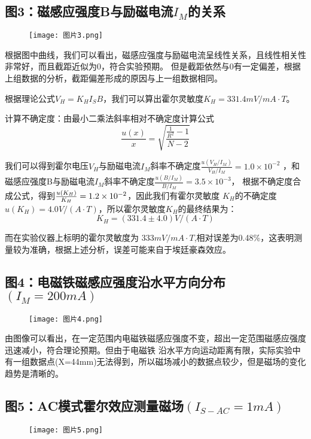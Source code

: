 \documentclass[12pt,a4paper]{article}
\begin{document}
    \subsection{图3：磁感应强度B与励磁电流$I_M$的关系}
    \begin{figure}[H]
        \centering
        \texttt{[image: 图片3.png]}
    \end{figure}

    根据图中曲线，我们可以看出，磁感应强度与励磁电流呈线性关系，且线性相关性非常好，而且截距近似为0，符合实验预期。
    但是截距依然与0有一定偏差，根据上组数据的分析，截距偏差形成的原因与上一组数据相同。
    ~\\\par
    根据理论公式${V_H} = {K_H}{I_S}B$，我们可以算出霍尔灵敏度$K_H=331.4mV/mA\cdot{T}$。

    计算不确定度：由最小二乘法斜率相对不确定度计算公式
    \[\frac{{u(x)}}{x} = \sqrt {\frac{{\frac{1}{{{R^2}}} - 1}}{{N - 2}}} \]

    我们可以得到霍尔电压$V_H$与励磁电流$I_M$斜率不确定度$\frac{{u({V_H}/{I_M})}}{{{V_H}/{I_M}}} = 1.0 \times {10^{ - 2}}$
    ，和磁感应强度B与励磁电流$I_M$斜率不确定度$\frac{{u(B/{I_M})}}{{B/{I_M}}} = 3.5 \times {10^{ - 3}}$，
    根据不确定度合成公式，得到$\frac{{u({K_H})}}{{{K_H}}} = 1.2 \times {10^{{\rm{ - }}2}}$，因此我们有霍尔灵敏度
    $K_H$的不确定度$u({K_H}) = 4.0V/(A \cdot T)$，所以霍尔灵敏度$K_H$的最终结果为：
    \[{K_H} = (331.4 \pm 4.0)V/(A \cdot T)\]

    而在实验仪器上标明的霍尔灵敏度为
    $333mV/mA\cdot{T}$,相对误差为0.48\%，这表明测量较为准确，根据上述分析，误差可能来自于埃廷豪森效应。

    \subsection{图4：电磁铁磁感应强度沿水平方向分布$(I_M=200mA)$}
    \begin{figure}[H]
        \centering
        \texttt{[image: 图片4.png]}
    \end{figure}

    由图像可以看出，在一定范围内电磁铁磁感应强度不变，超出一定范围磁感应强度迅速减小，符合理论预期。但由于电磁铁
    沿水平方向运动距离有限，实际实验中有一组数据点(X=44mm)无法得到，所以磁场减小的数据点较少，但是磁场的变化
    趋势是清晰的。

    \subsection{图5：AC模式霍尔效应测量磁场$(I_{S-AC}=1mA)$}
    \begin{figure}[H]
        \centering
        \texttt{[image: 图片5.png]}
    \end{figure}
\end{document}

